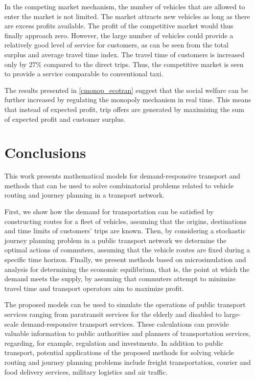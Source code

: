 \documentclass[dissertation,draft*]{aaltoseries}
\begin{document}
In the competing market mechanism, the number of vehicles that are allowed to enter the market is not limited. The market attracts new vehicles as long as there are excess profits available. The profit of the competitive market would thus finally approach zero. However, the large number of vehicles could provide a relatively good level of service for customers, as can be seen from the total surplus and average travel time index. 
The travel time of customers is increased only by 27\% compared to the direct trips. Thus, the competitive market is seen to
provide a service comparable to conventional taxi.

The results presented in \ref{cmonop_ecotran} suggest that the social welfare can be further increased by 
regulating the monopoly mechanism in real time. This means that instead of expected profit, trip offers are generated by maximizing 
the sum of expected profit and customer surplus. 


\chapter{Conclusions}
\label{conclusions}
This work presents mathematical models for demand-responsive transport and methods
that can be used to solve combinatorial problems related to vehicle routing and journey planning
in a transport network.

First,
we show how the demand for transportation can be satisfied by constructing routes for a fleet of vehicles,
assuming that the origins, destinations and time limits of customers' trips are known.
Then, by considering a stochastic journey planning problem in a public transport network we determine
the optimal actions of commuters, assuming that the vehicle routes are fixed during a specific time horizon.
Finally, we present methods based on microsimulation and analysis
for determining the economic equilibrium, that is, the point at which the demand meets the supply,
by assuming that commuters attempt to minimize travel time and transport operators aim to maximize profit.

The proposed models can be used to simulate the operations of public transport services ranging 
from paratransit services for the elderly and disabled to 
large-scale demand-responsive transport services. These calculations can 
provide valuable information to public authorities and planners of transportation services,
regarding, for example, regulation and investments.
In addition to public transport, potential applications of the proposed methods for solving vehicle routing and journey planning problems
include freight transportation, courier and food delivery services, military logistics and air traffic.
\end{document}
